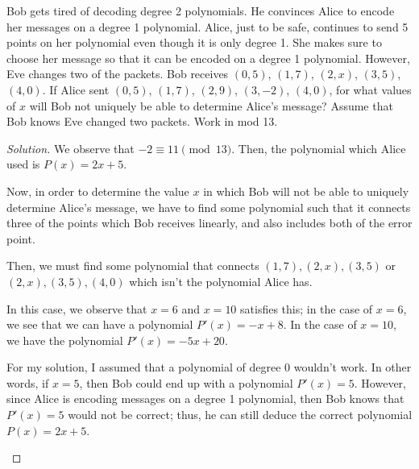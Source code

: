 \documentclass{article}
\newenvironment{solution}{\begin{proof}[Solution]}{\end{proof}}
\begin{document}
\begin{hw}
	Bob gets tired of decoding degree 2 polynomials. He convinces Alice to encode her messages on a degree 1 polynomial. Alice, just to be safe, continues to send 5 points on her polynomial even though it is only degree 1. She makes sure to choose her message so that it can be encoded on a degree 1 polynomial. However, Eve changes two of the packets. Bob receives $(0, 5)$, $(1, 7)$, $(2, x)$, $(3, 5)$, $(4, 0)$. If Alice sent $(0, 5)$, $(1, 7)$, $(2, 9)$, $(3, -2)$, $(4, 0)$, for what values of $x$ will Bob not uniquely be able to determine Alice's message? Assume that Bob knows Eve changed two packets. Work in mod 13.
\end{hw}
\begin{solution}
	We observe that $-2 \equiv 11 \pmod{13}$. Then, the polynomial which Alice used is $P(x) = 2x + 5$.
	
	Now, in order to determine the value $x$ in which Bob will not be able to uniquely determine Alice's message, we have to find some polynomial such that it connects three of the points which Bob receives linearly, and also includes both of the error point.
	
	Then, we must find some polynomial that connects $(1,7), (2,x), (3,5)$ or $(2,x), (3,5), (4,0)$ which isn't the polynomial Alice has.
	
	In this case, we observe that $x=6$ and $x=10$ satisfies this; in the case of $x=6$, we see that we can have a polynomial $P'(x) = -x + 8$. In the case of $x=10$, we have the polynomial $P'(x) = -5x + 20$.
	
	\begin{rmk}
		For my solution, I assumed that a polynomial of degree 0 wouldn't work. In other words, if $x=5$, then Bob could end up with a polynomial $P'(x) = 5$. However, since Alice is encoding messages on a degree 1 polynomial, then Bob knows that $P'(x) = 5$ would not be correct; thus, he can still deduce the correct polynomial $P(x) = 2x + 5$.
	\end{rmk}
\end{solution}
\end{document}
